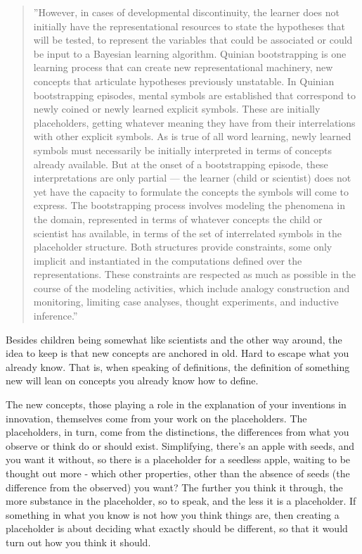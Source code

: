 \documentclass[graybox,envcountchap,sectrefs]{svmono}
\begin{document}
\begin{quote}
''However, in cases of developmental discontinuity, the learner does not initially have the representational resources to state the hypotheses that will be tested, to represent the variables that could be associated or could be input to a Bayesian learning algorithm. Quinian bootstrapping is one learning process that can create new representational machinery, new concepts that articulate hypotheses previously unstatable. In Quinian bootstrapping episodes, mental symbols are established that correspond to newly coined or newly learned explicit symbols. These are initially placeholders, getting whatever meaning they have from their interrelations with other explicit symbols. As is true of all word learning, newly learned symbols must necessarily be initially interpreted in terms of concepts already available. But at the onset of a bootstrapping episode, these interpretations are only partial — the learner (child or scientist) does not yet have the capacity to formulate the concepts the symbols will come to express. The bootstrapping process involves modeling the phenomena in the domain, represented in terms of whatever concepts the child or scientist has available, in terms of the set of interrelated symbols in the placeholder structure. Both structures provide constraints, some only implicit and instantiated in the computations defined over the representations. These constraints are respected as much as possible in the course of the modeling activities, which include analogy construction and monitoring, limiting case analyses, thought experiments, and inductive inference.'' \cite{carey2011precis}
\end{quote}

Besides children being somewhat like scientists and the other way around, the idea to keep is that new concepts are anchored in old. Hard to escape what you already know. That is, when speaking of definitions, the definition of something new will lean on concepts you already know how to define. 

The new concepts, those playing a role in the explanation of your inventions in innovation, themselves come from your work on the placeholders. The placeholders, in turn, come from the distinctions, the differences from what you observe or think do or should exist. Simplifying, there's an apple with seeds, and you want it without, so there is a placeholder for a seedless apple, waiting to be thought out more - which other properties, other than the absence of seeds (the difference from the observed) you want? The further you think it through, the more substance in the placeholder, so to speak, and the less it is a placeholder. If something in what you know is not how you think things are, then creating a placeholder is about deciding what exactly should be different, so that it would turn out how you think it should. 
\end{document}
